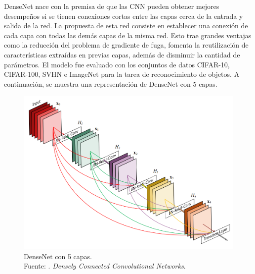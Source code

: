 DenseNet nace con la premisa de que las CNN pueden obtener mejores desempeños si se tienen conexiones cortas entre las capas cerca de la entrada y salida de la red. La propuesta de esta red consiste en establecer una conexión de cada capa con todas las demás capas de la misma red. Esto trae grandes ventajas como la reducción del problema de gradiente de fuga, fomenta la reutilización de características extraídas en previas capas, además de disminuir la cantidad de parámetros. El modelo fue evaluado con los conjuntos de datos CIFAR-10, CIFAR-100, SVHN e ImageNet para la tarea de reconocimiento de objetos. \parencite{pr_huang2016densconn} A continuación, se muestra una representación de DenseNet con 5 capas.

\begin{figure}[H]
	\begin{center}
		\includegraphics[width=1.00\textwidth]{2/figures/densenet_5lay.png}
		\caption[DenseNet con 5 capas]{DenseNet con 5 capas. \\
		Fuente: \cite{pr_huang2016densconn}. \textit{Densely Connected Convolutional Networks}.}
		\label{2:fig205}
	\end{center}
\end{figure}



